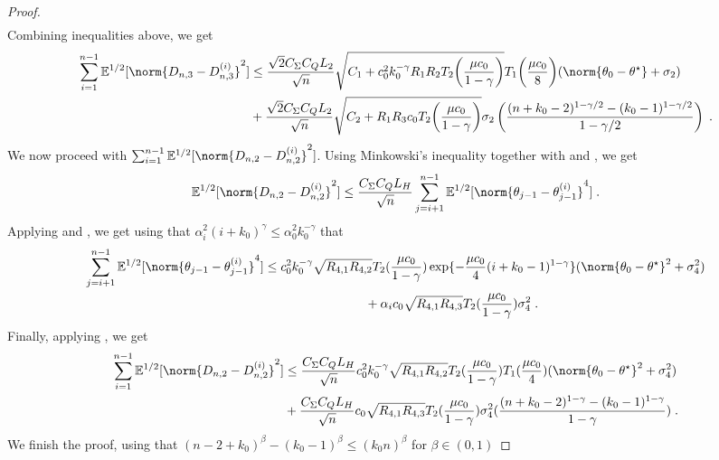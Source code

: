 \begin{proof}
\begin{align}
   \end{align}
   Combining inequalities above, we get 
   \begin{align}
       \sum_{i=1}^{n-1}\PE^{1/2}[\norm{D_{n,3}-D_{n,3}^{(i)}}^2] &\leq \frac{\sqrt{2}C_{\Sigma}C_QL_2}{\sqrt{n}}\sqrt{C_1+ c_0^2k_0^{-\gamma}R_1R_2T_2\biggl(\frac{\mu c_0}{1-\gamma}\biggr)}T_1\biggl(\frac{\mu c_0}{8}\biggr)(\norm{\theta_0-\thetas}+\sigma_2)\\ &+\frac{\sqrt{2}C_{\Sigma}C_QL_2}{\sqrt{n}}\sqrt{C_2+ R_1R_3c_0T_2\biggl(\frac{\mu c_0}{1-\gamma}\biggr)}\sigma_2\left(\frac{(n+k_0-2)^{1-\gamma/2}-(k_0-1)^{1-\gamma/2}}{1-\gamma/2}\right)\eqsp.
   \end{align}
   We now proceed with $\sum_{i=1}^{n-1}\PE^{1/2}[\norm{D_{n,2}-D_{n,2}^{(i)}}^2]$.
   Using Minkowski's inequality together with   and  , we get 
   \begin{equation}
       \PE^{1/2}[\norm{D_{n,2}-D_{n,2}^{(i)}}^2] \leq \frac{C_{\Sigma} C_Q L_H}{\sqrt{n}}\sum_{j=i+1}^{n-1}\PE^{1/2}[\norm{\theta_{j-1}-\theta_{j-1}^{(i)}}^4]\eqsp.
   \end{equation}
    Applying  and , we get using that $\alpha_i^2 (i+k_0)^{\gamma} \leq \alpha_0^2k_0^{-\gamma}$ that 
   \begin{align}
    \sum_{j=i+1}^{n-1}\PE^{1/2}[\norm{\theta_{j-1}-\theta_{j-1}^{(i)}}^4] &\leq c_0^2k_0^{-\gamma}\sqrt{R_{4,1}R_{4,2}}T_2(\frac{\mu c_0}{1-\gamma})\exp\{-\frac{\mu c_0}{4}(i+k_0-1)^{1-\gamma}\}(\norm{\theta_{0}-\thetas}^2 + \sigma_4^2) \\
       & \qquad \qquad \qquad \qquad + \alpha_ic_0\sqrt{R_{4,1}R_{4,3}}T_2(\frac{\mu c_0}{1-\gamma})\sigma_4^2\eqsp. 
   \end{align}
   Finally, applying , we get 
   \begin{align}
       \sum_{i=1}^{n-1}\PE^{1/2}[\norm{D_{n,2}-D_{n,2}^{(i)}}^2] &\leq \frac{C_{\Sigma} C_Q L_H}{\sqrt{n}}c_0^2k_0^{-\gamma}\sqrt{R_{4,1}R_{4,2}}T_2(\frac{\mu c_0}{1-\gamma})T_1(\frac{\mu c_0}{4})(\norm{\theta_{0}-\thetas}^2 + \sigma_4^2) \\&+ \frac{C_{\Sigma} C_Q L_H}{\sqrt{n}}c_0\sqrt{R_{4,1}R_{4,3}}T_2(\frac{\mu c_0}{1-\gamma})\sigma_4^2(\frac{(n+k_0-2)^{1-\gamma}-(k_0-1)^{1-\gamma}}{1-\gamma})\eqsp.
   \end{align}
   We finish the proof, using that $(n-2+k_0)^{\beta}- (k_0-1)^{\beta} \leq (k_0n)^{\beta}$ for $\beta \in (0,1)$
\end{proof}